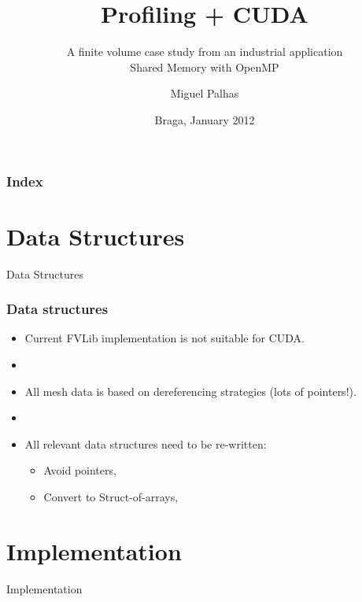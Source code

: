 \documentclass{beamer}
\title{Profiling + CUDA}
\subtitle{A finite volume case study from an industrial application\\\smaller Shared Memory with OpenMP}
\author{Miguel Palhas}
\institute[pg19808]{
	University of Minho \\
	Department of Informatics
}
\date{Braga, January 2012}
\begin{document}

\maketitle%

\begin{frame}
	\frametitle{Index}
	\tableofcontents
\end{frame}

\section{Data Structures}
\begin{frame}
	\begin{center}
		\Huge{Data Structures}
	\end{center}
\end{frame}

\begin{frame}
	\frametitle{Data structures}

	\begin{itemize}
		\item Current FVLib implementation is not suitable for CUDA.
		\item[]
		\item All mesh data is based on dereferencing strategies (lots of pointers!).
		\item[]
		\item All relevant data structures need to be re-written:
		\begin{itemize}
			\item Avoid pointers,
			\item Convert to Struct-of-arrays,
		\end{itemize}
	\end{itemize}
\end{frame}

\section{Implementation}
\begin{frame}
	\begin{center}
		\Huge{Implementation}
	\end{center}
\end{frame}
\end{document}
